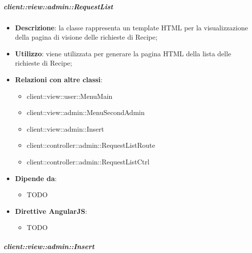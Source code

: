 		\subparagraph{client::view::admin::RequestList} %
		\label{subp:bdsm_app_client_view_admin_requestlist}

			\begin{itemize}
				\item \textbf{Descrizione}: la classe rappresenta un template HTML per la visualizzazione della pagina di visione delle richieste di Recipe;
				\item \textbf{Utilizzo}: viene utilizzata per generare la pagina HTML della lista delle richieste di Recipe;
				\item \textbf{Relazioni con altre classi}:
					\begin{itemize}
						\item client::view::user::MenuMain
						\item client::view::admin::MenuSecondAdmin
						\item client::view::admin::Insert
						\item client::controller::admin::RequestListRoute
						\item client::controller::admin::RequestListCtrl
					\end{itemize}
				\item \textbf{Dipende da}:
					\begin{itemize}
						\item TODO
					\end{itemize}
				\item \textbf{Direttive AngularJS}:
					\begin{itemize}
						\item TODO
					\end{itemize}
			\end{itemize}

		\subparagraph{client::view::admin::Insert} %
		\label{subp:bdsm_app_client_view_admin_insert}

